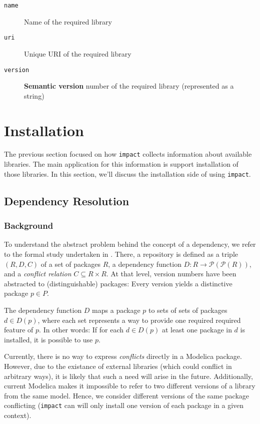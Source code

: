 \documentclass[11pt,a4paper,twocolumn]{article}
\newcommand{\code}[1]{\texttt{#1}} %
\begin{document}
\begin{description}
  \item[\code{name}] Name of the required library
  \item[\code{uri}] Unique URI of the required library
  \item[\code{version}] \textbf{Semantic version} number of the required
    library (represented as a string)
\end{description}

\section{Installation}

The previous section focused on how \code{impact} collects information
about available libraries.  The main application for this information
is support installation of those libraries.  In this section, we'll
discuss the installation side of using \code{impact}.

\subsection{Dependency Resolution}

\subsubsection{Background}

To understand the abstract problem behind the concept of a dependency,
we refer to the formal study undertaken in \parencite{boender2011formal}.
There, a repository is defined as a triple $(R,D,C)$ of a set of
packages $R$, a dependency function $D : R \rightarrow
\mathcal{P}(\mathcal{P}(R))$, and a \emph{conflict relation} $C
\subseteq R \times R$.  At that level, version numbers have been
abstracted to (distinguishable) packages: Every version yields a
distinctive package $p \in P$.

The dependency function $D$ maps a package $p$ to sets of sets of
packages $d \in D(p)$, where each set represents a way to provide one
required required feature of $p$.  In other words: If for each $d \in
D(p)$ at least one package in $d$ is installed, it is possible to use
$p$.

Currently, there is no way to express \emph{conflicts} directly in a
Modelica package.  However, due to the existance of external libraries
(which could conflict in arbitrary ways), it is likely that such a
need will arise in the future.  Additionally, current Modelica makes
it impossible to refer to two different versions of a library from the
same model.  Hence, we consider different versions of the same package
conflicting (\code{impact} can will only install one version of each
package in a given context).
\end{document}
